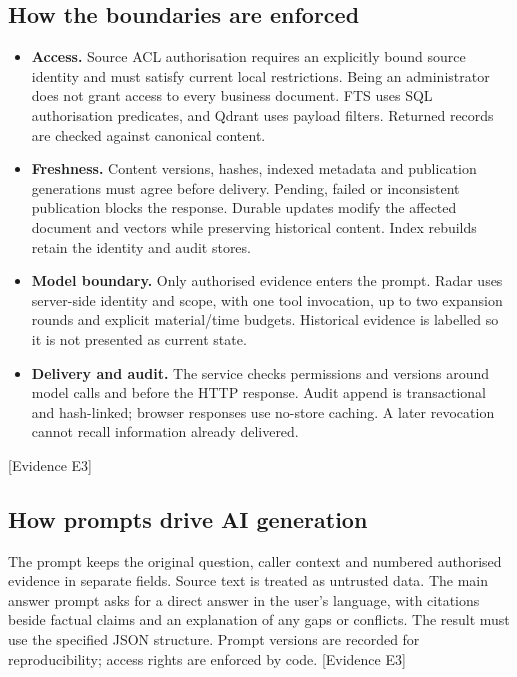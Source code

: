 \documentclass[10pt,a4paper]{article}
\newcommand{\evidence}[1]{{\footnotesize\textcolor{Muted}{[Evidence #1]}}}
\begin{document}
\subsection{How the boundaries are enforced}
\begin{itemize}
\item \textbf{Access.} Source ACL authorisation requires an explicitly bound source identity and must satisfy current local restrictions. Being an administrator does not grant access to every business document. FTS uses SQL authorisation predicates, and Qdrant uses payload filters. Returned records are checked against canonical content.
\item \textbf{Freshness.} Content versions, hashes, indexed metadata and publication generations must agree before delivery. Pending, failed or inconsistent publication blocks the response. Durable updates modify the affected document and vectors while preserving historical content. Index rebuilds retain the identity and audit stores.
\item \textbf{Model boundary.} Only authorised evidence enters the prompt. Radar uses server-side identity and scope, with one tool invocation, up to two expansion rounds and explicit material/time budgets. Historical evidence is labelled so it is not presented as current state.
\item \textbf{Delivery and audit.} The service checks permissions and versions around model calls and before the HTTP response. Audit append is transactional and hash-linked; browser responses use no-store caching. A later revocation cannot recall information already delivered.
\end{itemize}
\evidence{E3}

\clearpage
\subsection{How prompts drive AI generation}
The prompt keeps the original question, caller context and numbered authorised evidence in separate fields. Source text is treated as untrusted data. The main answer prompt asks for a direct answer in the user's language, with citations beside factual claims and an explanation of any gaps or conflicts. The result must use the specified JSON structure. Prompt versions are recorded for reproducibility; access rights are enforced by code. \evidence{E3}
\end{document}
